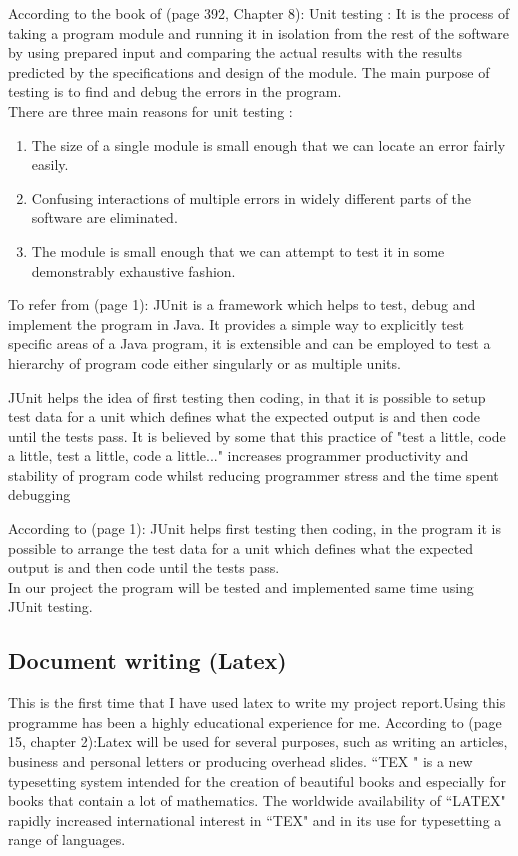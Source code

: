 \documentclass{report}
\begin{document}
According to the book of \cite{Jones1990SoftwareEngineering}(page 392, Chapter 8): Unit testing : It is the process of taking a program module and running it in isolation from the rest of the software by using prepared input and comparing the actual results with the results  predicted by the specifications and design of the module. The main purpose of testing is to find and debug the errors in the program.\\
There are three main reasons for unit testing :
\begin{enumerate}
\item The size of a single module is small enough that we can locate an error fairly easily.
\item Confusing interactions of multiple errors in widely different parts of the software are eliminated.
\item The module is small enough that we can attempt to test it in some demonstrably exhaustive fashion.
\end{enumerate}
To refer from \cite{JUnitTestingUtilityTutorial}(page 1): JUnit is a framework which helps to test, debug and implement the program in Java. It provides a simple way to explicitly test specific areas of a Java program, it is extensible and can be employed to test a hierarchy of program code either singularly or as multiple units.

JUnit helps the idea of first testing then coding, in that it is possible to setup test data for a unit which defines what the expected output is and then code until the tests pass. It is believed by some that this practice of "test a little, code a little, test a little, code a little..." increases programmer productivity and stability of program code whilst reducing programmer stress and the time spent debugging

According to \cite{JUnitTestingUtilityTutorial}(page 1): JUnit helps first testing then coding, in the program it is possible to arrange the test data for a unit which defines what the expected output is and then code until the tests pass.\\
In our project the program will be tested and implemented same time using JUnit testing.  


\subsection{Document writing (Latex)}
\label{sec:latex}
 This is the first time that I have used latex to write my project report.Using this programme has been a highly educational experience for me. 
According to \cite{Mittelbach2004TheLatexCompanion}(page 15, chapter 2):Latex will be used for several purposes, such as writing an articles, business and personal letters or producing overhead slides.
``TEX " is a new typesetting system intended for the creation of beautiful books and especially for books that contain a lot of mathematics. The worldwide availability of ``LATEX" rapidly increased international interest in ``TEX" and in its use for typesetting a range of languages.
\end{document}
